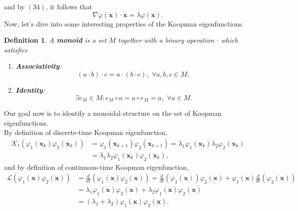 \documentclass[]{article}
\newtheorem{definition}{Definition}
\begin{document}
and by $(34)$, it follows that
\begin{equation}
	\nabla \varphi(\textbf{x}) \cdot \dot{\textbf{x}} = \lambda \varphi(\textbf{x}).
\end{equation}
Now, let's dive into some interesting properties of the Koopman eigenfunctions.  
\begin{definition}
A \textbf{monoid} is a set $M$ together with a binary operation $\cdot$ which satisfies
\begin{enumerate}
	\item \textbf{Associativity}: \begin{equation}
		(a \cdot b) \cdot c = a \cdot (b \cdot c), \,\, \forall a,b,c \in M;
	\end{equation}
	\item \textbf{Identity}: \begin{equation}
		\exists e_M \in M: e_M \circ a = a \circ e_M = a, \,\, \forall a \in M.
	\end{equation}
\end{enumerate}
\end{definition}
\noindent Our goal now is to identify a monoidal structure on the set of Koopman eigenfunctions. \\
By definition of discrete-time Koopman eigenfunction,
\begin{equation}
	\begin{split}
		\mathcal{K}_t(\varphi_1(\textbf{x}_k)\varphi_2(\textbf{x}_k)) & = \varphi_1(\textbf{x}_{k+1})\varphi_2(\textbf{x}_{k+1}) = \lambda_1 \varphi_1(\textbf{x}_k) \lambda_2 \varphi_2(\textbf{x}_k) \\ & = \lambda_1 \lambda_2 \varphi_1(\textbf{x}_k)  \varphi_2(\textbf{x}_k),
	\end{split}
\end{equation}
and by definition of continuous-time Koopman eigenfunction,
\begin{equation}
	\begin{split}
		\mathcal{L}(\varphi_1(\textbf{x})\varphi_2(\textbf{x})) & = \frac{d}{dt}(\varphi_1(\textbf{x})\varphi_2(\textbf{x})) = \frac{d}{dt}(\varphi_1(\textbf{x})) \varphi_2(\textbf{x})+\varphi_1(\textbf{x})\frac{d}{dt}(\varphi_2(\textbf{x})) \\ & = \lambda_1\varphi_1(\textbf{x})\varphi_2(\textbf{x})+\lambda_2\varphi_1(\textbf{x})\varphi_2(\textbf{x}) \\ & = (\lambda_1+\lambda_2)\varphi_1(\textbf{x})\varphi_2(\textbf{x}).
	\end{split}
\end{equation}
\end{document}

